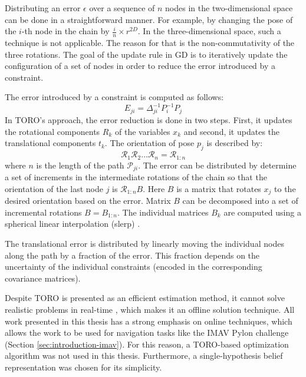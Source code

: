 Distributing an error $\epsilon$ over a sequence of $n$ nodes in the two-dimensional space can be done in a straightforward manner.
For example, by changing the pose of the $i$-th node in the chain by $\frac{i}{n} \times r^{2D}$.
In the three-dimensional space, such a technique is not applicable.
The reason for that is the non-commutativity of the three rotations.
The goal of the update rule in GD is to iteratively update the configuration of a set of nodes in order to reduce the error introduced by a constraint.

The error introduced by a constraint is computed as follows:
\begin{equation}
E_{ji} = \Delta_{ji}^{-1} P_i^{-1} P_j
\end{equation}
In TORO's approach, the error reduction is done in two steps.
First, it updates the rotational components $R_k$ of the variables $x_k$ and second, it updates the translational components $t_k$.
The orientation of pose $p_j$ is described by:
\begin{equation}
\mathcal{R}_1\mathcal{R}_2 \hdots \mathcal{R}_n = \mathcal{R}_{1:n}
\end{equation}
where $n$ is the length of the path $\mathcal{P}_{ji}$.
The error can be distributed by determine a set of increments in the intermediate rotations of the chain so that the orientation of the last node $j$ is $\mathcal{R}_{1:n} B$. Here $B$ is a matrix that rotates $x_j$ to the desired orientation based on the error.
Matrix $B$ can be decomposed into a set of incremental rotations $B = B_{1:n}$.
The individual matrices $B_k$ are computed using a spherical linear interpolation (slerp) \cite{barrera2004incremental}.

The translational error is distributed by linearly moving the individual nodes along the path by a fraction of the error.
This fraction depends on the uncertainty of the individual constraints (encoded in the corresponding covariance matrices).

Despite TORO is presented as an efficient estimation method, it cannot solve realistic problems in real-time \cite{grisetti2007efficient}, which makes it an offline solution technique.
All work presented in this thesis has a strong emphasis on online techniques, which allows the work to be used for navigation tasks like the IMAV Pylon challenge (Section \ref{sec:introduction-imav}).
For this reason, a TORO-based optimization algorithm was not used in this thesis.
Furthermore, a single-hypothesis belief representation was chosen for its simplicity.


